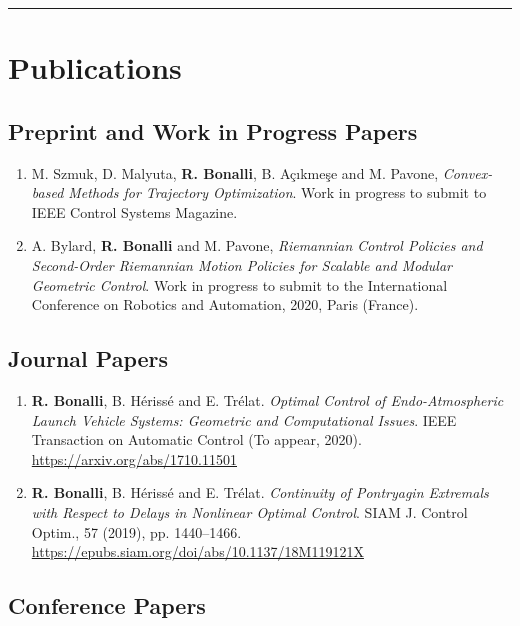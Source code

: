 \documentclass[a4paper,12pt]{article}
\begin{document}
\begingroup
\begin{center}
\noindent\rule{7cm}{0.4pt}
\end{center}
\endgroup

\section{Publications}

\subsection{Preprint and Work in Progress Papers}

\begin{enumerate}
\item M. Szmuk, D. Malyuta, \textbf{R. Bonalli}, B. A\c{c}ıkme\c{s}e and M. Pavone, \textit{Convex-based Methods for Trajectory Optimization}. Work in progress to submit to IEEE Control Systems Magazine.
\item A. Bylard, \textbf{R. Bonalli} and M. Pavone, \textit{Riemannian Control Policies and Second-Order Riemannian Motion Policies for Scalable and Modular Geometric Control}. Work in progress to submit to the International Conference on Robotics and Automation, 2020, Paris (France).
\end{enumerate}

\subsection{Journal Papers}

\begin{enumerate}
\item \textbf{R. Bonalli}, B. H\'{e}riss\'{e} and E. Tr\'{e}lat. \textit{Optimal Control of Endo-Atmospheric Launch Vehicle Systems: Geometric and Computational Issues}. IEEE Transaction on Automatic Control (To appear, 2020). \url{https://arxiv.org/abs/1710.11501}
\item \textbf{R. Bonalli}, B. H\'{e}riss\'{e} and E. Tr\'{e}lat. \textit{Continuity of Pontryagin Extremals with Respect to Delays in Nonlinear Optimal Control}. SIAM J. Control Optim., 57 (2019), pp. 1440--1466. \url{https://epubs.siam.org/doi/abs/10.1137/18M119121X}
\end{enumerate}

\subsection{Conference Papers}
\end{document}
